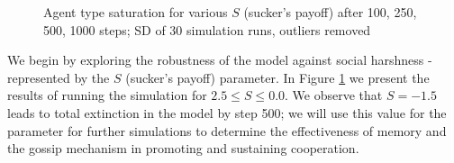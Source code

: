 \documentclass[english]{article}
\begin{document}
\begin{figure}[!ht]
  \centering
  \caption{Agent type saturation for various $S$ (sucker's payoff) after 100, 250, 500, 1000 steps; SD of 30 simulation runs, outliers removed}
  \label{fig:agent_sat/S-memory0gossip0}
\end{figure}

We begin by exploring the robustness of the model against social harshness - represented by the $S$ (sucker's payoff) parameter.
In Figure \ref{fig:agent_sat/S-memory0gossip0} we present the results of running the simulation for $2.5 \leq S \leq 0.0$.
We observe that $S = -1.5$ leads to total extinction in the model by step 500;
we will use this value for the parameter for further simulations to determine the effectiveness of memory and the gossip mechanism in promoting and sustaining cooperation.
\end{document}
